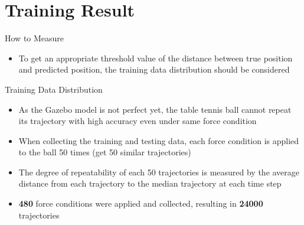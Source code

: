 \documentclass{beamer}
\begin{document}
	\section{Training Result}
	
	\begin{frame}{How to Measure}
	\begin{itemize}
	\item {To get an appropriate {\color{magenta}threshold value} of the distance between true position and predicted position, the {\color{magenta}training data distribution} should be considered}
	\end{itemize}	
	\end{frame}
	
	\begin{frame}{Training Data Distribution}
	\begin{itemize}
	\item {As the Gazebo model is not perfect yet, the table tennis ball {\color{blue}cannot repeat its trajectory with high accuracy} even under same force condition}
	\item {When collecting the training and testing data, each force condition is applied to the ball {\color{magenta}50} times (get 50 similar trajectories)}
	\item {The degree of repeatability of each 50 trajectories is measured by the {\color{magenta}average distance from each trajectory to the median trajectory at each time step}}
	\item {\textbf{480} force conditions were applied and collected, resulting in \textbf{24000} trajectories}
	\end{itemize}
	\end{frame}
	
\end{document}

